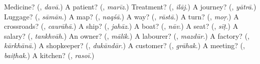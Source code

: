 \begin{tcolorbox}[breakable,colback=teal!4,colframe=teal!35!black,title={Before you move on}]
Medicine? (\textbf{}, \emph{davā}.) A patient? (\textbf{}, \emph{marīz}.) Treatment? (\textbf{}, \emph{ilāj}.) A journey? (\textbf{}, \emph{yātrā}.) Luggage? (\textbf{}, \emph{sāmān}.) A map? (\textbf{}, \emph{naqśā}.) A way? (\textbf{}, \emph{rāstā}.) A turn? (\textbf{}, \emph{moṛ}.) A crossroads? (\textbf{}, \emph{caurāhā}.) A ship? (\textbf{}, \emph{jahāz}.) A boat? (\textbf{}, \emph{nāv}.) A seat? (\textbf{}, \emph{sīṭ}.) A salary? (\textbf{}, \emph{tankhvāh}.) An owner? (\textbf{}, \emph{mālik}.) A labourer? (\textbf{}, \emph{mazdūr}.) A factory? (\textbf{}, \emph{kārkhānā}.) A shopkeeper? (\textbf{}, \emph{dukāndār}.) A customer? (\textbf{}, \emph{grāhak}.) A meeting? (\textbf{}, \emph{baiṭhak}.) A kitchen? (\textbf{}, \emph{rasoī}.)
\end{tcolorbox}
